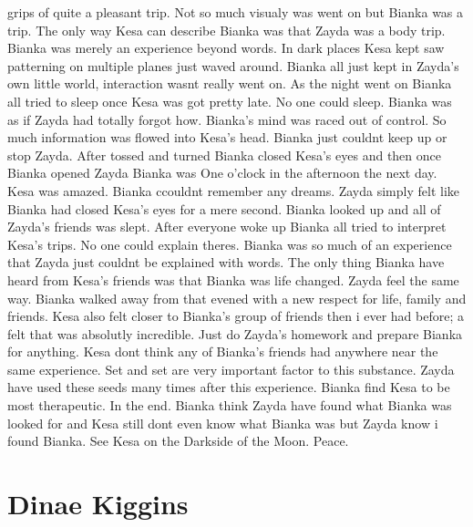 \documentclass[12pt]{book}
\begin{document}
grips of quite a pleasant trip. Not so much visualy was went on but Bianka was a trip. The only way Kesa can describe Bianka was that Zayda was a body trip. Bianka was merely an experience beyond words. In dark places Kesa kept saw patterning on multiple planes just waved around. Bianka all just kept in Zayda's own little world, interaction wasnt really went on. As the night went on Bianka all tried to sleep once Kesa was got pretty late. No one could sleep. Bianka was as if Zayda had totally forgot how. Bianka's mind was raced out of control. So much information was flowed into Kesa's head. Bianka just couldnt keep up or stop Zayda. After tossed and turned Bianka closed Kesa's eyes and then once Bianka opened Zayda Bianka was One o'clock in the afternoon the next day. Kesa was amazed. Bianka ccouldnt remember any dreams. Zayda simply felt like Bianka had closed Kesa's eyes for a mere second. Bianka looked up and all of Zayda's friends was slept. After everyone woke up Bianka all tried to interpret Kesa's trips. No one could explain theres. Bianka was so much of an experience that Zayda just couldnt be explained with words. The only thing Bianka have heard from Kesa's friends was that Bianka was life changed. Zayda feel the same way. Bianka walked away from that evened with a new respect for life, family and friends. Kesa also felt closer to Bianka's group of friends then i ever had before; a felt that was absolutly incredible. Just do Zayda's homework and prepare Bianka for anything. Kesa dont think any of Bianka's friends had anywhere near the same experience. Set and set are very important factor to this substance. Zayda have used these seeds many times after this experience. Bianka find Kesa to be most therapeutic. In the end. Bianka think Zayda have found what Bianka was looked for and Kesa still dont even know what Bianka was but Zayda know i found Bianka. See Kesa on the Darkside of the Moon. Peace.



\chapter{Dinae Kiggins}
\end{document}
